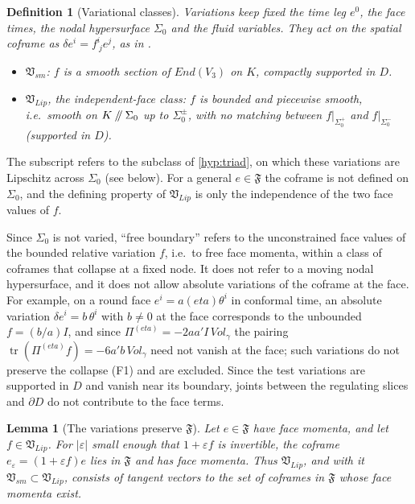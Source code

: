 \documentclass[11pt]{article}
\theoremstyle{canonmath}
\newtheorem{lemma}[theorem]{Lemma}
\newtheorem{definition}[theorem]{Definition}
\theoremstyle{canonpostulate}
\theoremstyle{canonproposition}
\theoremstyle{canonmath}
\theoremstyle{canonproposition}
\providecommand{\cutK}{\Klein\mathbin{/\mkern-5mu/}\Sigma_0}
\providecommand{\Vb}{\mathcal{V}}
\providecommand{\Vlip}{\mathfrak{V}_{\mathrm{Lip}}}
\providecommand{\Vsm}{\mathfrak{V}_{\mathrm{sm}}}
\providecommand{\Fcl}{\mathfrak{F}}
\providecommand{\Klein}{\mathcal{K}}
\def\mathrm#1{#1}%
\def\mathcal#1{#1}%
\def\eta{eta}%
\begin{document}
\begin{definition}[Variational classes]\label{def:classes}
Variations keep fixed the time leg $e^0$, the face times, the nodal hypersurface $\Sigma_0$ and the fluid variables. They act on the spatial coframe as $\delta e^i = f^i_{\ j}e^j$, as in \cite{TBT2026}.
\begin{itemize}
\item $\Vsm$: $f$ is a smooth section of $\mathrm{End}(\Vb_3)$ on $\Klein$, compactly supported in $\mathcal{D}$.
\item $\Vlip$, the \emph{independent-face class}: $f$ is bounded and piecewise smooth, i.e.\ smooth on $\cutK$ up to $\Sigma_0^\pm$, with no matching between $f|_{\Sigma_0^+}$ and $f|_{\Sigma_0^-}$ (supported in $\mathcal{D}$).
\end{itemize}
\end{definition}

The subscript refers to the subclass of \ref{hyp:triad}, on which these variations are Lipschitz across $\Sigma_0$ (see below). For a general $e\in\Fcl$ the coframe is not defined on $\Sigma_0$, and the defining property of $\Vlip$ is only the independence of the two face values of $f$.

Since $\Sigma_0$ is not varied, ``free boundary'' refers to the unconstrained face values of the bounded relative variation $f$, i.e.\ to free face momenta, within a class of coframes that collapse at a fixed node. It does not refer to a moving nodal hypersurface, and it does not allow absolute variations of the coframe at the face. For example, on a round face $e^i = a(\eta)\theta^i$ in conformal time, an absolute variation $\delta e^i = b\,\theta^i$ with $b\neq0$ at the face corresponds to the unbounded $f = (b/a)I$, and since $\Pi^{(\eta)} = -2aa'I\,\mathrm{Vol}_\gamma$ the pairing $\operatorname{tr}(\Pi^{(\eta)}f) = -6a'b\,\mathrm{Vol}_\gamma$ need not vanish at the face; such variations do not preserve the collapse (F1) and are excluded. Since the test variations are supported in $\mathcal{D}$ and vanish near its boundary, joints between the regulating slices and $\partial\mathcal D$ do not contribute to the face terms.

\begin{lemma}[The variations preserve $\Fcl$]\label{lem:closure}
Let $e\in\Fcl$ have face momenta, and let $f\in\Vlip$. For $|\varepsilon|$ small enough that $1+\varepsilon f$ is invertible, the coframe $e_\varepsilon = (1+\varepsilon f)e$ lies in $\Fcl$ and has face momenta. Thus $\Vlip$, and with it $\Vsm\subset\Vlip$, consists of tangent vectors to the set of coframes in $\Fcl$ whose face momenta exist.
\end{lemma}
\end{document}
